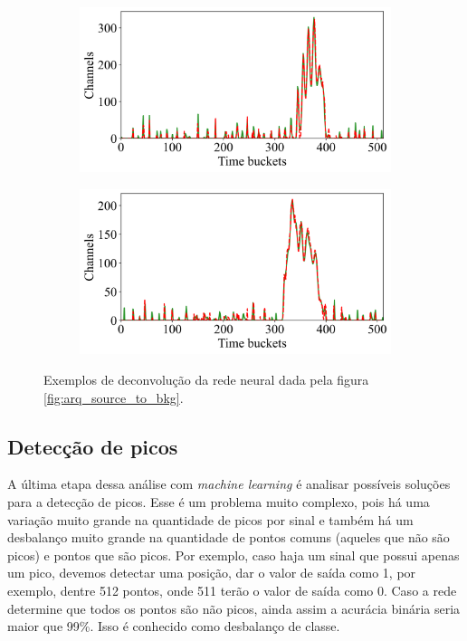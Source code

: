 \documentclass[a4paper,12pt,oneside]{book}
\begin{document}
\begin{figure}[H]
\begin{subfigure}[b]{0.465\textwidth}
        \caption{}
        \label{subfig:std_ex2}
    \end{subfigure}
    \begin{subfigure}[b]{0.49\textwidth}
        \centering
        \includegraphics[scale=0.425]{figs/swbtd_3.png}
        \caption{}
        \label{subfig:std_ex3}
    \end{subfigure}%
    \hfill
    \begin{subfigure}[b]{0.465\textwidth}
        \centering
        \includegraphics[scale=0.425]{figs/swbtd_4.png}
        \caption{}
        \label{subfig:std_ex4}
    \end{subfigure}
\caption{Exemplos de deconvolução da rede neural dada pela figura \ref{fig:arq_source_to_bkg}.}
\label{fig:std_examples}
\end{figure}

\subsection{Detecção de picos}

\par A última etapa dessa análise com \textit{machine learning} é analisar possíveis soluções para a detecção de picos. Esse é um problema muito complexo, pois há uma variação muito grande na quantidade de picos por sinal e também há um desbalanço muito grande na quantidade de pontos comuns (aqueles que não são picos) e pontos que são picos. Por exemplo, caso haja um sinal que possui apenas um pico, devemos detectar uma posição, dar o valor de saída como 1, por exemplo, dentre 512 pontos, onde 511 terão o valor de saída como 0. Caso a rede determine que todos os pontos são não picos, ainda assim a acurácia binária seria maior que 99\%. Isso é conhecido como desbalanço de classe\cite{inproceedings}.
\end{document}

